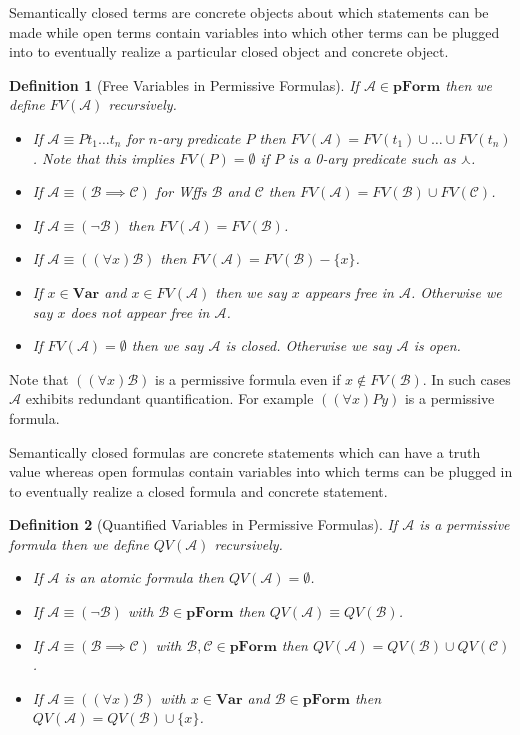 \documentclass[12pt]{article}
\theoremstyle{break}
\newtheorem{definition}{Definition}[section]
\theoremstyle{break}
\theoremstyle{break}
\theoremstyle{break}
\theoremstyle{break}
\newtheorem{informal definition}[definition]{Informal Definition}
\newcommand{\mc}[1]{\mathcal{#1}}
\begin{document}
Semantically closed terms are concrete objects about which statements can be made while open terms contain variables into which other terms can be plugged into to eventually realize a particular closed object and concrete object.

\begin{definition}[Free Variables in Permissive Formulas]
If $\mc{A}\in\textbf{pForm}$ then we define $FV(\mc{A})$ recursively.
\begin{itemize}
\item{If $\mc{A} \equiv Pt_1\ldots t_n$ for $n$-ary predicate $P$ then $FV(\mc{A}) = FV(t_1)\cup\ldots\cup FV(t_n)$. Note that this implies $FV(P)=\emptyset$ if $P$ is a 0-ary predicate such as $\curlywedge$.}
\item{If $\mc{A} \equiv (\mc{B}\implies \mc{C})$ for Wffs $\mc{B}$ and $\mc{C}$ then $FV(\mc{A}) = FV(\mc{B})\cup FV(\mc{C})$.}
\item{If $\mc{A} \equiv (\lnot\mc{B})$ then $FV(\mc{A}) = FV(\mc{B})$.}
\item{If $\mc{A} \equiv ((\forall x)\mc{B})$ then $FV(\mc{A}) = FV(\mc{B}) - \{x\}$.}
\item{If $x \in \textbf{Var}$ and $x\in FV(\mc{A})$ then we say $x$ appears free in $\mc{A}$. Otherwise we say $x$ does not appear free in $\mc{A}$.}
\item{If $FV(\mc{A}) = \emptyset$ then we say $\mc{A}$ is closed. Otherwise we say $\mc{A}$ is open.}
\end{itemize}
\end{definition}

Note that $((\forall x) \mc{B})$ is a permissive formula even if $x\not \in FV(\mc{B})$.
In such cases $\mc{A}$ exhibits redundant quantification.
For example $((\forall x) Py)$ is a permissive formula.

Semantically closed formulas are concrete statements which can have a truth value whereas open formulas contain variables into which terms can be plugged in to eventually realize a closed formula and concrete statement.

\begin{definition}[Quantified Variables in Permissive Formulas]
If $\mc{A}$ is a permissive formula then we define $QV(\mc{A})$ recursively.

\begin{itemize}
\item{If $\mc{A}$ is an atomic formula then $QV(\mc{A}) = \emptyset$.}
\item{If $\mc{A} \equiv (\lnot \mc{B})$ with $\mc{B}\in\textbf{pForm}$ then $QV(\mc{A}) \equiv QV(\mc{B})$.}
\item{If $\mc{A} \equiv (\mc{B} \implies \mc{C})$ with $\mc{B}, \mc{C}\in\textbf{pForm}$ then $QV(\mc{A}) = QV(\mc{B}) \cup QV(\mc{C})$.}
\item{If $\mc{A} \equiv ((\forall x) \mc{B})$ with $x\in\textbf{Var}$ and $\mc{B}\in\textbf{pForm}$ then $QV(\mc{A}) = QV(\mc{B}) \cup \{x\}$.}
\end{itemize}
\end{definition}
\end{document}
